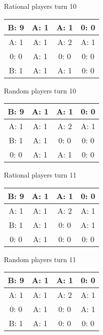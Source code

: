 \documentclass[12pt]{article}
\begin{document}
Rational players turn 10
\begin{center}
\begin{tabular}{|c|c|c|c|} 
\hline
B: 9  & A: 1  & A: 1  & 0: 0  \\ \hline
A: 1  & A: 1  & A: 2  & A: 1  \\ \hline
0: 0  & A: 1  & 0: 0  & 0: 0  \\ \hline
B: 1  & A: 1  & A: 1  & 0: 0  \\ \hline
\end{tabular} 
\end{center}
Random players turn 10
\begin{center}
\begin{tabular}{|c|c|c|c|} 
\hline
B: 9  & A: 1  & A: 1  & 0: 0  \\ \hline
A: 1  & A: 1  & A: 2  & A: 1  \\ \hline
B: 1  & A: 1  & 0: 0  & 0: 0  \\ \hline
0: 0  & A: 1  & A: 1  & 0: 0  \\ \hline
\end{tabular} 
\end{center}

Rational players turn 11
\begin{center}
\begin{tabular}{|c|c|c|c|} 
\hline
B: 9  & A: 1  & A: 1  & 0: 0  \\ \hline
A: 1  & A: 1  & A: 2  & A: 1  \\ \hline
B: 1  & A: 1  & 0: 0  & A: 1  \\ \hline
0: 0  & A: 1  & 0: 0  & 0: 0  \\ \hline
\end{tabular} 
\end{center}
Random players turn 11
\begin{center}
\begin{tabular}{|c|c|c|c|} 
\hline
B: 9  & A: 1  & A: 1  & 0: 0  \\ \hline
A: 1  & A: 1  & A: 2  & A: 1  \\ \hline
0: 0  & A: 1  & 0: 0  & A: 1  \\ \hline
B: 1  & A: 1  & 0: 0  & 0: 0  \\ \hline
\end{tabular} 
\end{center}
\end{document}
